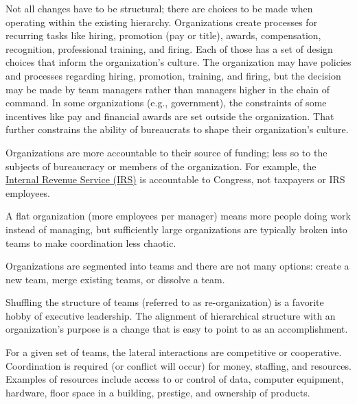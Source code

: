 Not all changes have to be structural; there are choices to be made when operating within the existing hierarchy. Organizations create processes for recurring tasks like hiring, promotion (pay or title), awards, compensation, recognition, professional training, and firing. Each of those has a set of design choices that inform the organization's culture. The organization may have policies and processes regarding hiring, promotion, training, and firing, but the decision may be made by team managers rather than managers higher in the chain of command.  In some organizations (e.g., government), the constraints of some incentives like pay and financial awards are set outside the organization. That further constrains the ability of bureaucrats to shape their organization's culture.



Organizations are more accountable to their source of funding; less so to the subjects of bureaucracy or members of the organization. For example, the \href{https://en.wikipedia.org/wiki/Internal_Revenue_Service}{Internal Revenue Service (IRS)} 
%
is accountable to Congress, not taxpayers or IRS employees. 



A flat organization (more employees per manager) means more people doing work instead of managing, but sufficiently large organizations are typically broken into teams to make coordination less chaotic. 


Organizations are segmented into teams and there are not many options: create a new team, merge existing teams, or dissolve a team. 


Shuffling the structure of teams (referred to as re-organization) is a favorite hobby of executive leadership. The alignment of hierarchical structure with an organization's purpose is a change that is easy to point to as an accomplishment. 


For a given set of teams, the lateral interactions are competitive or cooperative. Coordination is required (or conflict will occur) for money, staffing, and resources. Examples of resources include access to or control of data, computer equipment, hardware, floor space in a building, prestige, and ownership of products.

